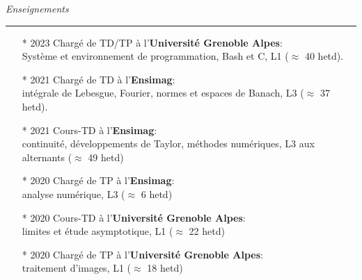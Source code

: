 \documentclass[a4paper,10pt, french]{article}
\begin{document}


\noindent
\textit{\Large \color{MyGray} \hspace{5mm} Enseignements}
\vspace{2mm}
{\color{DefaultGray}\hrule height .1pt}
\vspace{4mm}

\begin{itemize}
	\setlength\itemsep{3mm}
	\item[*] 2023 Chargé de TD/TP à l'\textbf{Université Grenoble Alpes}:\\
	Système et environnement de programmation, Bash et C, L1 ($\approx$ 40 hetd).
	\item[*] 2021 Chargé de TD à l'\textbf{Ensimag}:\\
	intégrale de Lebesgue, Fourier, normes et espaces de Banach, L3 ($\approx$ 37 hetd).
	\item[*] 2021 Cours-TD à l'\textbf{Ensimag}:\\
	continuité, développements de Taylor, méthodes numériques, L3 aux alternants ($\approx$ 49 hetd)
	\item[*] 2020 Chargé de TP à l'\textbf{Ensimag}:\\ analyse numérique, L3 ($\approx$ 6 hetd)
	\item[*] 2020 Cours-TD à l'\textbf{Université Grenoble Alpes}:\\
	limites et étude asymptotique, L1 ($\approx$ 22 hetd)
	\item[*] 2020 Chargé de TP à l'\textbf{Université Grenoble Alpes}:\\
	traitement d'images, L1 ($\approx$ 18 hetd)
\end{itemize}
\end{document}
